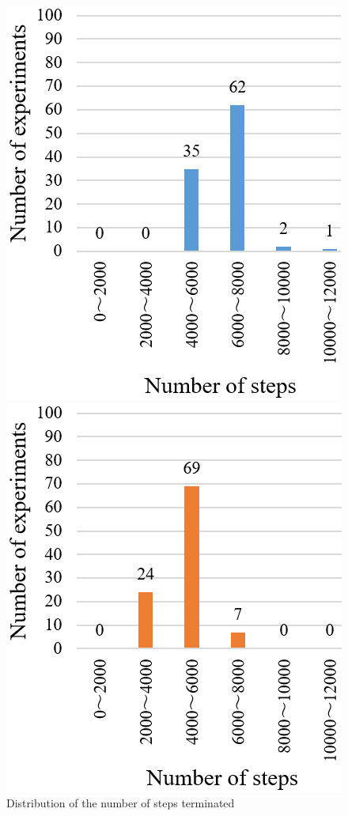 \documentclass{jarticle}
\begin{document}
\begin{figure}[htbp]
  \begin{minipage}[t]{0.5\linewidth}
    \centering
    \includegraphics[keepaspectratio, scale=0.27]{./png/c.png}
  \end{minipage}
  \begin{minipage}[t]{0.5\linewidth}
    \centering
    \includegraphics[keepaspectratio, scale=0.273]{./png/p.png}
  \end{minipage}
  \caption{Distribution of the number of steps terminated}
   \label{fig:11}
\end{figure}
\end{document}
